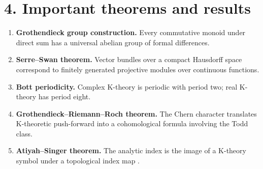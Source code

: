 \section*{4. Important theorems and results}
\begin{enumerate}[leftmargin=*,itemsep=0.35em]
\item \textbf{Grothendieck group construction.} Every commutative monoid under direct sum has a universal abelian group of formal differences.

\item \textbf{Serre--Swan theorem.} Vector bundles over a compact Hausdorff space correspond to finitely generated projective modules over continuous functions.

\item \textbf{Bott periodicity.} Complex K-theory is periodic with period two; real K-theory has period eight.

\item \textbf{Grothendieck--Riemann--Roch theorem.} The Chern character translates K-theoretic push-forward into a cohomological formula involving the Todd class.

\item \textbf{Atiyah--Singer theorem.} The analytic index is the image of a K-theory symbol under a topological index map \cite{k_theory_ref2}.
\end{enumerate}

